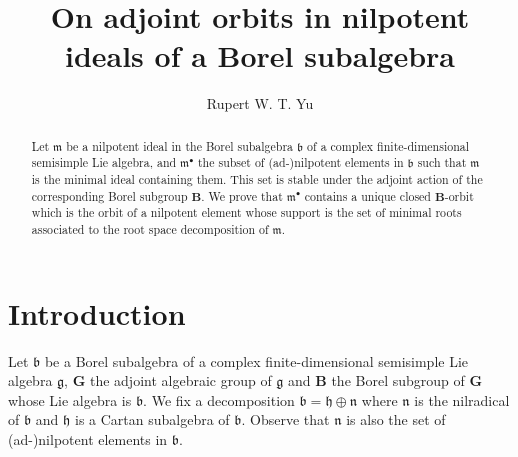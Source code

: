 \documentclass{amsart}
\theoremstyle{definition}
\theoremstyle{remark}
\numberwithin{equation}{section}
\newcommand{\group}[1]{\mathbf{#1}}
\begin{document}
\title[On adjoint orbits in nilpotent ideals of a Borel subalgebra]{On adjoint orbits in nilpotent ideals of a Borel subalgebra}

\author[Rupert Yu]{Rupert W. T. Yu}

\address{%
Laboratoire de Math\'ematiques de Reims UMR 9008 CNRS\\ 
Universit\'e de Reims Champagne Ardenne\\
Moulin de la Housse - BP 1039\\
51687 REIMS cedex 2\\
France}


\begin{abstract}
Let $\mathfrak{m}$ be a nilpotent ideal in the Borel subalgebra $\mathfrak{b}$ of a complex 
finite-dimensional semisimple Lie algebra, and $\mathfrak{m}^{\bullet}$ the subset of 
(ad-)nilpotent elements in $\mathfrak{b}$ such that $\mathfrak{m}$ is the minimal ideal containing them. 
This set is stable under the adjoint action of the corresponding Borel subgroup $\group{B}$. We prove that 
$\mathfrak{m}^{\bullet}$ contains a unique closed $\group{B}$-orbit which is the orbit of a nilpotent 
element whose support is the set of minimal roots associated to the root space decomposition 
of $\mathfrak{m}$.
\end{abstract}



\maketitle

\section{Introduction}

Let $\mathfrak{b}$ be a Borel subalgebra of a complex finite-dimensional semisimple Lie algebra 
$\mathfrak{g}$, $\group{G}$ the adjoint algebraic group of $\mathfrak{g}$ and $\group{B}$ the 
Borel subgroup of $\group{G}$ whose Lie algebra is $\mathfrak{b}$.
We fix a decomposition $\mathfrak{b} = \mathfrak{h}\oplus \mathfrak{n}$ where $\mathfrak{n}$
is the nilradical of $\mathfrak{b}$ and $\mathfrak{h}$ is a Cartan subalgebra of $\mathfrak{b}$.
Observe that $\mathfrak{n}$ is also the set of (ad-)nilpotent elements in $\mathfrak{b}$.
\end{document}
